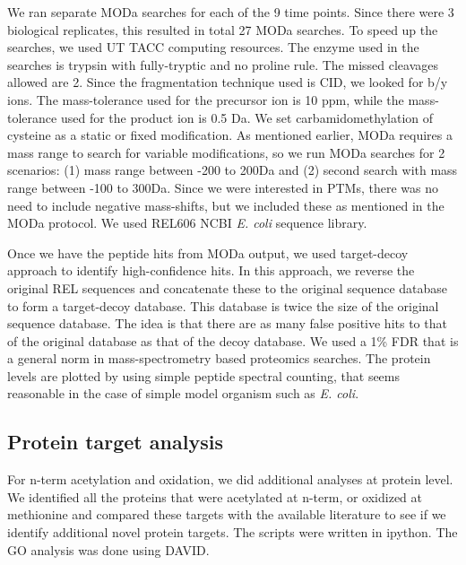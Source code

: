 \documentclass[12pt]{article}
\begin{document}
We ran separate MODa searches for each of the 9 time points. Since there were 3 biological replicates, this resulted in total 27 MODa searches.  To speed up the searches, we used UT TACC computing resources. The enzyme used in the searches is trypsin with fully-tryptic and no proline rule. The missed cleavages allowed are 2. Since the fragmentation technique used is CID, we looked for b/y ions. The mass-tolerance used for the precursor ion is 10 ppm, while the mass-tolerance used for the product ion is 0.5 Da. We set carbamidomethylation of cysteine as a static or fixed modification. As mentioned earlier, MODa requires a mass range to search for variable modifications, so we run MODa searches for 2 scenarios: (1) mass range between -200 to 200Da and (2) second search with mass range between -100 to 300Da. Since we were interested in PTMs, there was no need to include negative mass-shifts, but we included these as mentioned in the MODa protocol. We used REL606 NCBI \emph{E. coli} sequence library. 

Once we have the peptide hits from MODa output, we used target-decoy approach \cite{EliasGygi2007} to identify high-confidence hits. In this approach, we reverse the original REL sequences and concatenate these to the original sequence database to form a target-decoy database. This database is twice the size of the original sequence database. The idea is that there are as many false positive hits to that of the original database as that of the decoy database. We used a 1\% FDR that is a general norm in mass-spectrometry based proteomics searches. The protein levels are plotted by using simple peptide spectral counting, that seems reasonable in the case of simple model organism such as \emph{E. coli}.

\subsection{Protein target analysis} 

For n-term acetylation and oxidation, we did additional analyses at protein level. We identified all the proteins that were acetylated at n-term,  or oxidized at methionine and compared these targets with the available literature to see if we identify additional novel protein targets. The scripts were written in ipython. The GO analysis was done using DAVID.

\end{document}
